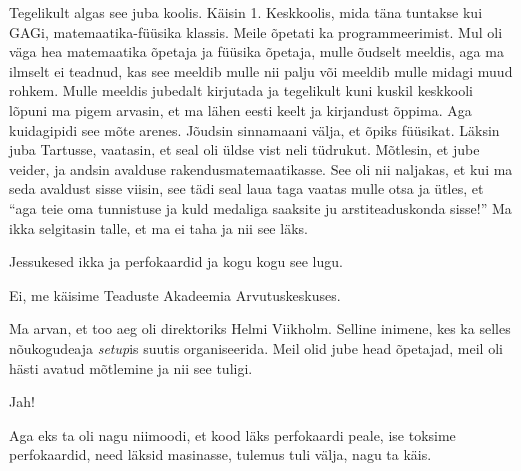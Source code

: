 

Tegelikult algas see juba koolis. Käisin 1. Keskkoolis, mida täna tuntakse kui GAGi, 
matemaatika-füüsika klassis. Meile õpetati ka programmeerimist. Mul oli väga 
hea matemaatika õpetaja ja füüsika õpetaja, mulle õudselt meeldis, aga ma 
ilmselt ei teadnud, kas see meeldib mulle nii palju või meeldib mulle midagi 
muud rohkem. Mulle meeldis jubedalt kirjutada ja tegelikult kuni kuskil 
keskkooli lõpuni ma pigem arvasin, et ma lähen eesti keelt ja kirjandust 
õppima. Aga kuidagipidi see mõte arenes. Jõudsin sinnamaani välja, et õpiks 
füüsikat. Läksin juba Tartusse, vaatasin, et seal oli üldse vist neli tüdrukut. 
Mõtlesin, et jube veider, ja andsin avalduse rakendusmatemaatikasse. See oli nii naljakas, et 
kui ma seda avaldust sisse viisin, see tädi seal laua taga vaatas mulle otsa ja 
ütles, et \enquote{aga teie oma  tunnistuse ja kuld medaliga saaksite ju 
arstiteaduskonda sisse!} Ma ikka selgitasin talle, et ma ei taha ja nii see 
läks. 


Jessukesed ikka ja perfokaardid ja kogu kogu see lugu. 


Ei, me käisime Teaduste Akadeemia Arvutuskeskuses.


Ma arvan, et too aeg oli direktoriks Helmi Viikholm. 
Selline inimene, kes ka selles nõukogudeaja \emph{setup}is suutis 
organiseerida. Meil olid jube head õpetajad, meil oli hästi avatud mõtlemine ja 
nii see tuligi.


Jah!

Aga eks ta oli nagu niimoodi, et kood läks perfokaardi peale, ise toksime 
perfokaardid, need läksid masinasse, tulemus tuli välja, nagu ta käis. 


